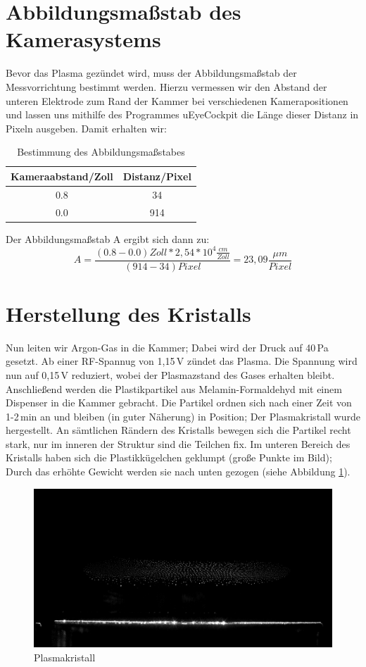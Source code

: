 \section{Abbildungsmaßstab des Kamerasystems}
Bevor das Plasma gezündet wird, muss der Abbildungsmaßstab der Messvorrichtung bestimmt werden. Hierzu vermessen wir den Abstand der unteren Elektrode zum Rand der Kammer bei verschiedenen Kamerapositionen und lassen uns mithilfe des Programmes \glqq uEyeCockpit\grqq{} die Länge dieser Distanz in Pixeln ausgeben. Damit erhalten wir:

\begin{table}[ht]
    \centering
    \begin{tabular}{c|c}
         Kameraabstand/Zoll& Distanz/Pixel \\\hline
         0.8 & 34 \\
         0.0 & 914 \\
    \end{tabular}
    \caption{Bestimmung des Abbildungsmaßstabes}
    \label{tab:abbmaß}
\end{table}

Der Abbildungsmaßstab A ergibt sich dann zu:
$$
    A=\frac{(0.8-0.0)Zoll*2,54*10^4\frac{cm}{Zoll}}{(914-34)Pixel}=23,09\frac{\mu m}{Pixel} 
$$

\section{Herstellung des Kristalls}
Nun leiten wir Argon-Gas in die Kammer; Dabei wird der Druck auf 40\,Pa gesetzt. Ab einer RF-Spannug von 1,15\,V zündet das Plasma. Die Spannung wird nun auf 0,15\,V reduziert, wobei der Plasmazstand des Gases erhalten bleibt. Anschließend werden die Plastikpartikel aus Melamin-Formaldehyd mit einem Dispenser in die Kammer gebracht. Die Partikel ordnen sich nach einer Zeit von 1-2\,min an und bleiben (in guter Näherung) in Position; Der Plasmakristall wurde hergestellt. An sämtlichen Rändern des Kristalls bewegen sich die Partikel recht stark, nur im inneren der Struktur sind die Teilchen fix. Im unteren Bereich des Kristalls haben sich die Plastikkügelchen \glqq geklumpt\grqq{} (große Punkte im Bild); Durch das erhöhte Gewicht werden sie nach unten gezogen (siehe Abbildung \ref{fig:groWo}).


\begin{figure}[ht]
    \includegraphics[scale=0.208]{data/Groesse-Teilchenwolke.jpg}
    \caption{Plasmakristall}
    \label{fig:groWo}
\end{figure}

